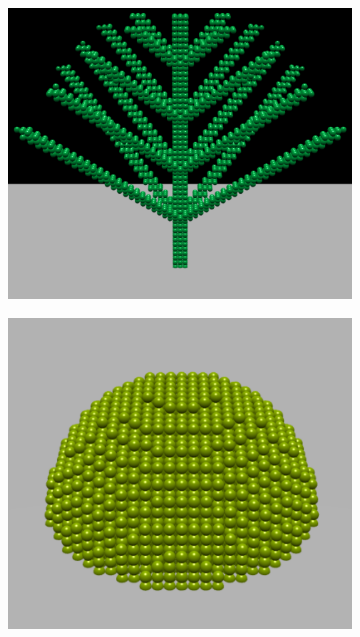 \documentclass[9pt]{pnas-new}
\begin{document}
\begin{figure}[!htb]
    \centering
    \begin{subfigure}{0.3\textwidth}
        \includegraphics[width=\textwidth]{fig/branching.png}
        \caption{}
    \end{subfigure}
    \begin{subfigure}{0.3\textwidth}
        \includegraphics[width=\textwidth]{fig/hemispherical.png}
        \caption{}

\end{subfigure}
\end{figure}
\end{document}
